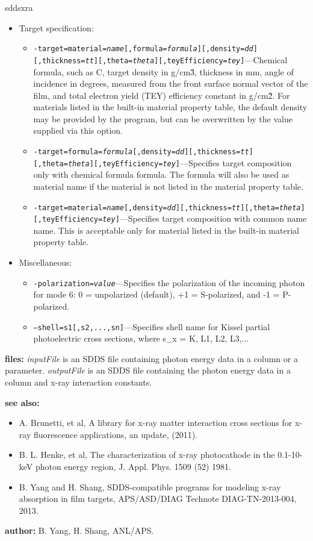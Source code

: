 \begin{sddsprog}{sddsxra}
\begin{itemize}
\begin{itemize}
    \end{itemize}
  \item Target specification:
    \begin{itemize}
      \item {\tt -target=material={\em name}[,formula={\em formula}][,density={\em dd}][,thickness={\em tt}][,theta={\em theta}][,teyEfficiency={\em tey}]}---Chemical formula, such as C, target density in g/cm\^{3}, thickness in mm, angle of incidence in degrees, measured from the front surface normal vector of the film, and total electron yield (TEY) efficiency constant in g/cm\^{2}. For materials listed in the built-in material property table, the default density may be provided by the program, but can be overwritten by the value supplied via this option.
      \item {\tt -target=formula={\em formula}[,density={\em dd}][,thickness={\em tt}][,theta={\em theta}][,teyEfficiency={\em tey}]}---Specifies target composition only with chemical formula formula. The formula will also be used as material name if the material is not listed in the material property table.
      \item {\tt -target=material={\em name}[,density={\em dd}][,thickness={\em tt}][,theta={\em theta}][,teyEfficiency={\em tey}]}---Specifies target composition with common name name. This is acceptable only for material listed in the built-in material property table.
    \end{itemize}
  \item Miscellaneous:
    \begin{itemize}
      \item {\tt -polarization={\em value}}---Specifies the polarization of the incoming photon for mode 6: 0 = unpolarized (default), +1 = S-polarized, and -1 = P-polarized.
      \item {\tt --shell=s1[,s2,...,sn]}---Specifies shell name for Kissel partial photoelectric cross sections, where s\_x = K, L1, L2, L3,...
    \end{itemize}
  \end{itemize}
\item \textbf{files:}
  {\em inputFile} is an SDDS file containing photon energy data in a column or a parameter. {\em outputFile} is an SDDS file containing the photon energy data in a column and x-ray interaction constants.
\item \textbf{see also:}
  \begin{itemize}
  \item A. Brunetti, et al, A library for x-ray matter interaction cross sections for x-ray fluorescence applications, an update, (2011).
  \item B. L. Henke, et al, The characterization of x-ray photocathode in the 0.1-10-keV photon energy region, J. Appl. Phys. 1509 (52) 1981.
  \item B. Yang and H. Shang, SDDS-compatible programs for modeling x-ray absorption in film targets, APS/ASD/DIAG Technote DIAG-TN-2013-004, 2013.
  \end{itemize}
\item \textbf{author:} B. Yang, H. Shang, ANL/APS.
\end{sddsprog}

